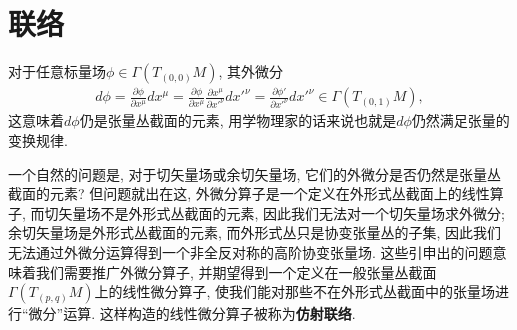 \section{联络}

对于任意标量场$\phi\in \varGamma(T_{(0, 0)}M)$, 其外微分
\begin{eqnarray}
  d\phi=\frac{\partial\phi}{\partial x^\mu}dx^\mu=\frac{\partial\phi}{\partial {x}^\mu}\frac{\partial{x}^\mu}{\partial {x'}^\nu}d{x'}^\nu=\frac{\partial{\phi'}}{\partial {x'}^\nu}d{x'}^\nu\in \varGamma(T_{(0, 1)}M),
\end{eqnarray}
这意味着$d\phi$仍是张量丛截面的元素, 用学物理家的话来说也就是$d\phi$仍然满足张量的变换规律.

一个自然的问题是, 对于切矢量场或余切矢量场, 它们的外微分是否仍然是张量丛截面的元素? 但问题就出在这, 外微分算子是一个定义在外形式丛截面上的线性算子, 而切矢量场不是外形式丛截面的元素, 因此我们无法对一个切矢量场求外微分;余切矢量场是外形式丛截面的元素, 而外形式丛只是协变张量丛的子集, 因此我们无法通过外微分运算得到一个非全反对称的高阶协变张量场. 这些引申出的问题意味着我们需要推广外微分算子, 并期望得到一个定义在一般张量丛截面$\varGamma(T_{(p, q)}M)$上的线性微分算子, 使我们能对那些不在外形式丛截面中的张量场进行“微分”运算. 这样构造的线性微分算子被称为\textbf{仿射联络}.

